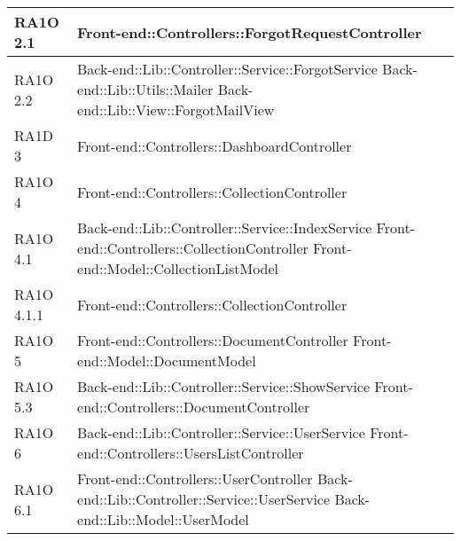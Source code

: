 \begin{center}
\begin{longtable}{ | p{3cm} | p{11cm} | }
    RA1O 2.1 & Front-end::Controllers::ForgotRequestController \newline  \\ \hline   
       
    RA1O 2.2 & Back-end::Lib::Controller::Service::ForgotService \newline
    			  			Back-end::Lib::Utils::Mailer \newline
    			  			Back-end::Lib::View::ForgotMailView \newline  \\ \hline     
    			   
     
    RA1D 3 & Front-end::Controllers::DashboardController \newline  \\ \hline  
        
    RA1O 4 & Front-end::Controllers::CollectionController \newline  \\ \hline   
       
    RA1O 4.1 & Back-end::Lib::Controller::Service::IndexService \newline Front-end::Controllers::CollectionController \newline Front-end::Model::CollectionListModel \newline  \\ \hline   
       
    RA1O 4.1.1 & Front-end::Controllers::CollectionController \newline  \\ \hline 
         
    RA1O 5 & Front-end::Controllers::DocumentController \newline
    			 Front-end::Model::DocumentModel \newline  \\ \hline    
           
    RA1O 5.3 & Back-end::Lib::Controller::Service::ShowService \newline
    			 Front-end::Controllers::DocumentController\newline  \\ \hline      
    
    RA1O 6 & Back-end::Lib::Controller::Service::UserService \newline Front-end::Controllers::UsersListController  \\ \hline  
        
    RA1O 6.1 & Front-end::Controllers::UserController \newline Back-end::Lib::Controller::Service::UserService \newline Back-end::Lib::Model::UserModel \\ \hline   
       

\end{longtable}
\end{center}
